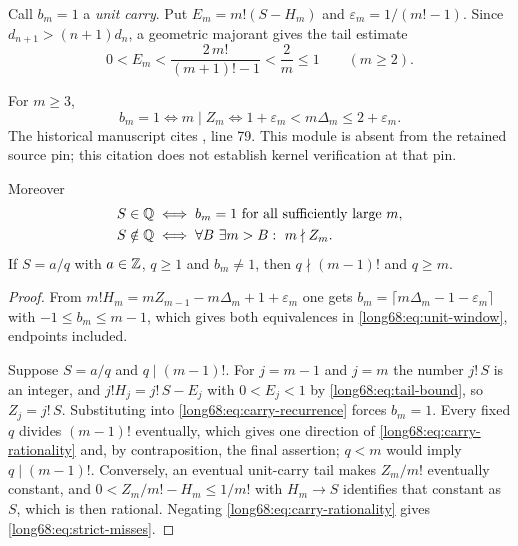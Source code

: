 \documentclass[11pt]{article}
\newcommand{\Ser}{S}
\begin{document}
Call $b_m=1$ a \emph{unit carry}.  Put
$E_m=m!(\Ser-H_m)$ and $\varepsilon_m=1/(m!-1)$.  Since
$d_{n+1}>(n+1)d_n$, a geometric majorant gives the tail estimate
\begin{equation}\label{long68:eq:tail-bound}
 0<E_m<\frac{2\,m!}{(m+1)!-1}<\frac2m\le1\qquad(m\ge2).
\end{equation}

\label{long68:res:lead-carry-equivalence}
\label{long68:res:strict-successor-complete-characterization}
\begin{theorem}\label{long68:res:carry-equivalence}
For $m\ge3$,
\begin{equation}\label{long68:eq:unit-window}
 b_m=1
 \iff m\mid Z_m
 \iff 1+\varepsilon_m<m\Delta_m\le2+\varepsilon_m .
\end{equation}
  The historical manuscript cites , line 79. This module is absent from the retained source pin; this citation does not establish kernel verification at that pin.

Moreover
\begin{align}
 \Ser\in\Q
 &\iff b_m=1\ \hbox{for all sufficiently large }m,
 \label{long68:eq:carry-rationality}\\
 \Ser\notin\Q
 &\iff \forall B\ \exists m>B:\ m\nmid Z_m .
 \label{long68:eq:strict-misses}
\end{align}
If $\Ser=a/q$ with $a\in\mathbb{Z}$, $q\ge1$ and $b_m\ne1$, then $q\nmid(m-1)!$ and
$q\ge m$.
\end{theorem}

\begin{proof}
From $m!H_m=mZ_{m-1}-m\Delta_m+1+\varepsilon_m$ one gets
$b_m=\lceil m\Delta_m-1-\varepsilon_m\rceil$ with $-1\le b_m\le m-1$, which
gives both equivalences in \eqref{long68:eq:unit-window}, endpoints included.

Suppose $\Ser=a/q$ and $q\mid(m-1)!$.  For $j=m-1$ and $j=m$ the number
$j!\,\Ser$ is an integer, and $j!H_j=j!\,\Ser-E_j$ with $0<E_j<1$ by
\eqref{long68:eq:tail-bound}, so $Z_j=j!\,\Ser$.  Substituting into
\eqref{long68:eq:carry-recurrence} forces $b_m=1$.  Every fixed $q$ divides
$(m-1)!$ eventually, which gives one direction of
\eqref{long68:eq:carry-rationality} and, by contraposition, the final assertion;
$q<m$ would imply $q\mid(m-1)!$.  Conversely, an eventual unit-carry tail
makes $Z_m/m!$ eventually constant, and $0<Z_m/m!-H_m\le1/m!$ with
$H_m\to\Ser$ identifies that constant as $\Ser$, which is then rational.
Negating \eqref{long68:eq:carry-rationality} gives \eqref{long68:eq:strict-misses}.
\end{proof}
\end{document}
